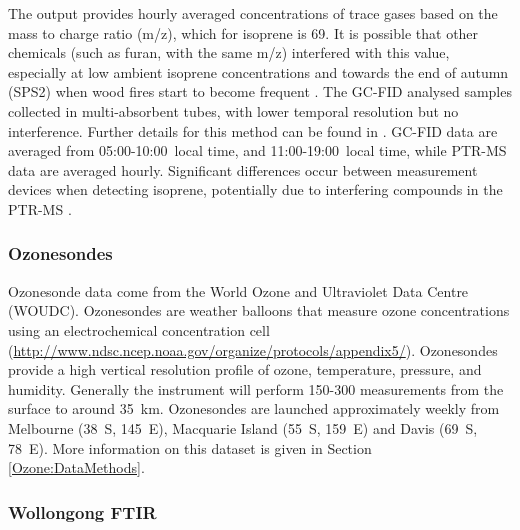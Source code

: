       The output provides hourly averaged concentrations of trace gases based on the mass to charge ratio (m/z), which for isoprene is 69.
      It is possible that other chemicals (such as furan, with the same m/z) interfered with this value, especially at low ambient isoprene concentrations and towards the end of autumn (SPS2) when wood fires start to become frequent \parencite{Guerette2018}.
      The GC-FID analysed samples collected in multi-absorbent tubes, with lower temporal resolution but no interference. 
      Further details for this method can be found in \textcite{Cheng2016}.
      GC-FID data are averaged from 05:00-10:00~local time, and 11:00-19:00~local time, while PTR-MS data are averaged hourly.
      Significant differences occur between measurement devices when detecting isoprene, potentially due to interfering compounds in the PTR-MS \parencite{Dunne2018}.
      
      
    \subsubsection{Ozonesondes}
    \label{Model:datasets:ozonesondes}
    
      Ozonesonde data come from the World Ozone and Ultraviolet Data Centre (WOUDC).
      Ozonesondes are weather balloons that measure ozone concentrations using an electrochemical concentration cell (\url{http://www.ndsc.ncep.noaa.gov/organize/protocols/appendix5/}).
      Ozonesondes provide a high vertical resolution profile of ozone, temperature, pressure, and humidity.
      Generally the instrument will perform 150-300 measurements from the surface to around 35~km.
      Ozonesondes are launched approximately weekly from Melbourne (38\degr ~S, 145\degr ~E), Macquarie Island (55\degr ~S, 159\degr ~E) and Davis (69\degr ~S, 78\degr ~E). 
      More information on this dataset is given in Section \ref{Ozone:DataMethods}.
    
    \subsubsection{Wollongong FTIR}
    \label{Model:datasets:wollongong_ftir}
    
